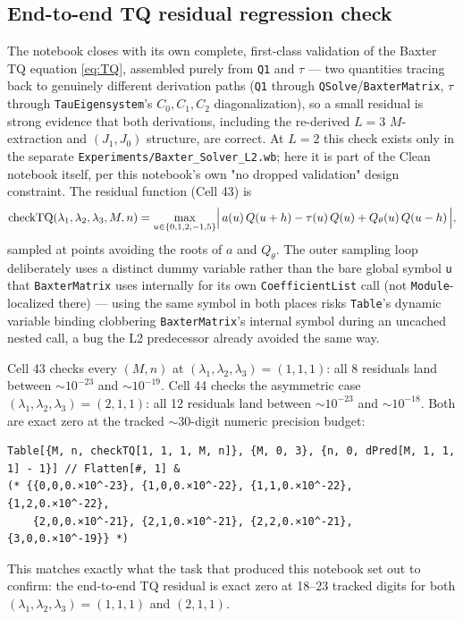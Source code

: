 \documentclass[11pt]{article}
\newcommand{\qth}{Q_\theta}
\begin{document}
\subsection*{End-to-end TQ residual regression check}
\label{sec:endtoend}

The notebook closes with its own complete, first-class validation of the Baxter TQ equation
\eqref{eq:TQ}, assembled purely from \texttt{Q1} and $\tau$ --- two quantities tracing back to
genuinely different derivation paths (\texttt{Q1} through \texttt{QSolve}/\texttt{BaxterMatrix},
$\tau$ through \texttt{TauEigensystem}'s $C_0,C_1,C_2$ diagonalization), so a small residual is strong
evidence that both derivations, including the re-derived $L=3$ $M$-extraction and $(J_1,J_0)$
structure, are correct. At $L=2$ this check exists only in the separate
\texttt{Experiments/Baxter\_Solver\_L2.wb}; here it is part of the Clean notebook itself, per this
notebook's own "no dropped validation" design constraint. The residual function (Cell 43) is
\[
  \mathrm{checkTQ}(\lambda_1,\lambda_2,\lambda_3,M,n) = \max_{u\in\{0,1,2,-1,5\}}
  \Bigl|\,a(u)\,Q(u+h) - \tau(u)\,Q(u) + \qth(u)\,Q(u-h)\,\Bigr|,
\]
sampled at points avoiding the roots of $a$ and $\qth$. The outer sampling loop deliberately uses a
distinct dummy variable rather than the bare global symbol \texttt{u} that \texttt{BaxterMatrix} uses
internally for its own \texttt{CoefficientList} call (not \texttt{Module}-localized there) --- using
the same symbol in both places risks \texttt{Table}'s dynamic variable binding clobbering
\texttt{BaxterMatrix}'s internal symbol during an uncached nested call, a bug the L2 predecessor
already avoided the same way.

Cell 43 checks every $(M,n)$ at $(\lambda_1,\lambda_2,\lambda_3)=(1,1,1)$: all 8 residuals land
between $\sim10^{-23}$ and $\sim10^{-19}$. Cell 44 checks the asymmetric case
$(\lambda_1,\lambda_2,\lambda_3)=(2,1,1)$: all 12 residuals land between $\sim10^{-23}$ and
$\sim10^{-18}$. Both are exact zero at the tracked $\sim30$-digit numeric precision budget:
\begin{verbatim}
Table[{M, n, checkTQ[1, 1, 1, M, n]}, {M, 0, 3}, {n, 0, dPred[M, 1, 1, 1] - 1}] // Flatten[#, 1] &
(* {{0,0,0.×10^-23}, {1,0,0.×10^-22}, {1,1,0.×10^-22}, {1,2,0.×10^-22},
    {2,0,0.×10^-21}, {2,1,0.×10^-21}, {2,2,0.×10^-21}, {3,0,0.×10^-19}} *)
\end{verbatim}
This matches exactly what the task that produced this notebook set out to confirm: the end-to-end TQ
residual is exact zero at 18--23 tracked digits for both $(\lambda_1,\lambda_2,\lambda_3)=(1,1,1)$ and
$(2,1,1)$.
\end{document}
